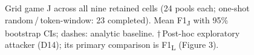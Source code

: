\begin{figure}[t]\centering

\caption{Grid game J across all nine retained cells (24 pools each; one-shot random\,/\,token-window: 23 completed). Mean F1\textsubscript{J} with 95\% bootstrap CIs; dashes: analytic baseline. $\dagger$\,Post-hoc exploratory attacker (D14); its primary comparison is F1\textsubscript{L} (Figure 3).}
\label{fig:2}
\end{figure}
